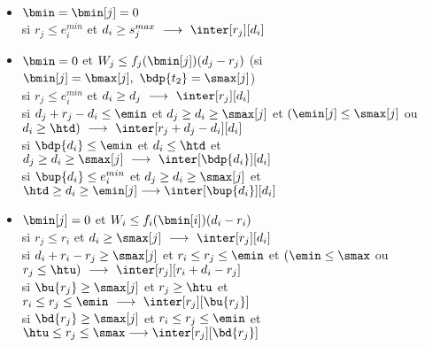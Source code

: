 \documentclass{report}
\begin{document}
\begin{itemize}
\item $\bmin = \bmin[j] = 0$\\
  \vspace{0.2cm}
  si $r_j \le e_i^{min}$ et $d_i \ge s_j^{max}\ \longrightarrow\ 
  \inter[r_j][d_i]$\\
  
  \vspace{0.5cm}
  
\item $\bmin=0$ et $W_j \le f_j(\bmin[j])(d_j-r_j)$ 
  (si $\bmin[j]=\bmax[j],\ \bdp{t_2}=\smax[j]$)\\
  \vspace{0.2cm}
  si $r_j \le e_i^{min}$ et $d_i \ge d_j\ \longrightarrow\ \inter[r_j][d_i]$\\
  \vspace{0.1cm}
  si $d_j+r_j-d_i \le \emin$ et $d_j \ge d_i \ge \smax[j]$ et 
  $(\emin[j] \le \smax[j]$ ou $d_i \ge \htd)\ \longrightarrow\ 
  \inter[r_j+d_j-d_i][d_i]$\\
  \vspace{0.1cm}
  si $\bdp{d_i} \le \emin$ et $d_i \le \htd$ 
  et $d_j \ge d_i \ge \smax[j]\ \longrightarrow\ 
  \inter[\bdp{d_i}][d_i]$\\
  \vspace{0.1cm}
  si $\bup{d_i} \le e_i^{min}$ et $d_j\ge d_i \ge \smax[j]$ et $\htd \ge d_i \ge \emin[j] \longrightarrow \inter[\bup{d_i}][d_i]$\\

  \vspace{0.5cm}

  
\item $\bmin[j]=0$ et $W_i \le f_i(\bmin[i])(d_i-r_i)$\\
  \vspace{0.2cm}
  si $r_j \le r_i$ et $d_i \ge \smax[j]\ \longrightarrow\ \inter[r_j][d_i]$\\
  \vspace{0.1cm}
  si $d_i+r_i-r_j \ge \smax[j]$ et $r_i \le r_j \le \emin$ et 
  $(\emin \le \smax$ ou $r_j \le \htu)\ \longrightarrow\ 
  \inter[r_j][r_i+d_i-r_j]$\\
  \vspace{0.1cm}
  si $\bu{r_j} \ge \smax[j]$ et $r_j \ge \htu$ 
  et $r_i \le r_j \le \emin\ \longrightarrow\ 
  \inter[r_j][\bu{r_j}]$\\
  \vspace{0.1cm}
  si $\bd{r_j} \ge \smax[j]$ et $r_i\le r_j \le \emin$ et $\htu \le r_j \le \smax \longrightarrow \inter[r_j][\bd{r_j}]$\\


\end{itemize}
\end{document}
